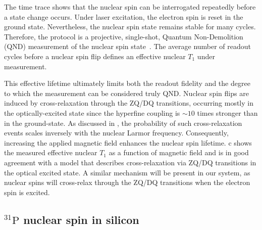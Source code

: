 The time trace shows that the nuclear spin can be interrogated repeatedly before a state change occurs. Under laser excitation, the electron spin is reset in the ground state. Nevertheless, the nuclear spin state remains stable for many cycles. Therefore, the protocol is a projective, single-shot, Quantum Non-Demolition (QND) measurement of the nuclear spin state~. The average number of readout cycles before a nuclear spin flip defines an effective nuclear $T_1$ under measurement.

This effective lifetime ultimately limits both the readout fidelity and the degree to which the measurement can be considered truly QND. Nuclear spin flips are induced by cross-relaxation through the ZQ/DQ transitions, occurring mostly in the optically-excited state since the hyperfine coupling is $\sim 10$ times stronger than in the ground-state. As discussed in , the probability of such cross-relaxation events scales inversely with the nuclear Larmor frequency. Consequently, increasing the applied magnetic field enhances the nuclear spin lifetime. c shows the measured effective nuclear $T_1$ as a function of magnetic field and is in good agreement with a model that describes cross-relaxation via ZQ/DQ transitions in the optical excited state. A similar mechanism will be present in our system, as \W nuclear spins will cross-relax through the ZQ/DQ transitions when the electron spin is excited.



\subsection*{$^{31}\mathrm{P}$ nuclear spin in silicon}

